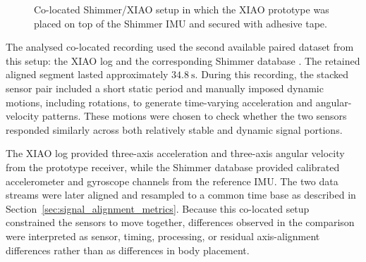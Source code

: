 \begin{figure}[!htbp]
    \centering
    \captionsetup{skip=2pt}
    \caption{Co-located Shimmer/XIAO setup in which the XIAO prototype was placed on top of the Shimmer IMU and secured with adhesive tape.}
    \label{fig:colocated_shimmer_xiao_setup}
\end{figure}

The analysed co-located recording used the second available paired dataset from this setup: the XIAO log  and the corresponding Shimmer database . The retained aligned segment lasted approximately \(34.8~\si{\second}\). During this recording, the stacked sensor pair included a short static period and manually imposed dynamic motions, including rotations, to generate time-varying acceleration and angular-velocity patterns. These motions were chosen to check whether the two sensors responded similarly across both relatively stable and dynamic signal portions.

The XIAO log provided three-axis acceleration and three-axis angular velocity from the prototype receiver, while the Shimmer database provided calibrated accelerometer and gyroscope channels from the reference IMU. The two data streams were later aligned and resampled to a common time base as described in Section~\ref{sec:signal_alignment_metrics}. Because this co-located setup constrained the sensors to move together, differences observed in the comparison were interpreted as sensor, timing, processing, or residual axis-alignment differences rather than as differences in body placement.

